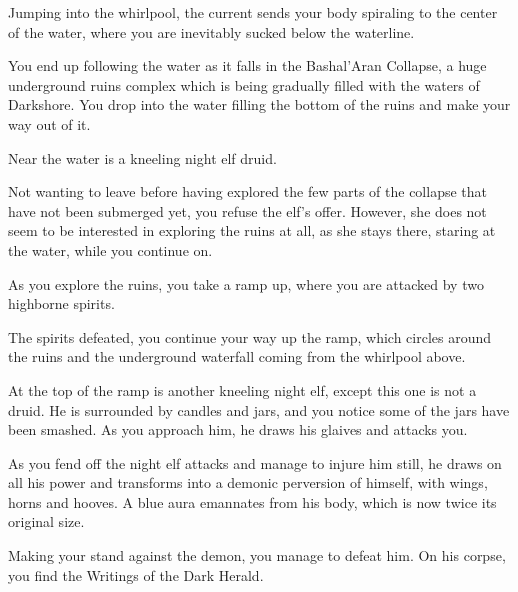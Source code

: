 Jumping into the whirlpool, the current sends your body spiraling to the center of the water, where you are inevitably sucked below the waterline.

You end up following the water as it falls in the Bashal'Aran Collapse, a huge underground ruins complex which is being gradually filled with the waters of Darkshore. You drop into the water filling the bottom of the ruins and make your way out of it.

Near the water is a kneeling night elf druid.


Not wanting to leave before having explored the few parts of the collapse that have not been submerged yet, you refuse the elf's offer. However, she does not seem to be interested in exploring the ruins at all, as she stays there, staring at the water, while you continue on.

As you explore the ruins, you take a ramp up, where you are attacked by two highborne spirits.




The spirits defeated, you continue your way up the ramp, which circles around the ruins and the underground waterfall coming from the whirlpool above.

At the top of the ramp is another kneeling night elf, except this one is not a druid. He is surrounded by candles and jars, and you notice some of the jars have been smashed. As you approach him, he draws his glaives and attacks you.


As you fend off the night elf attacks and manage to injure him still, he draws on all his power and transforms into a demonic perversion of himself, with wings, horns and hooves. A blue aura emannates from his body, which is now twice its original size.


Making your stand against the demon, you manage to defeat him. On his corpse, you find the Writings of the Dark Herald.

